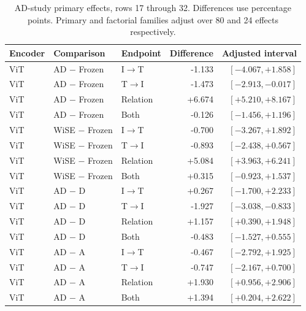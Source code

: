\begin{table}[t]
\centering
\small
\setlength{\tabcolsep}{3pt}
\begin{tabular}{lllrr}
\toprule
Encoder & Comparison & Endpoint & Difference & Adjusted interval\\
\midrule
ViT & AD $-$ Frozen & I$\to$T & -1.133 & $[-4.067,+1.858]$ \\
ViT & AD $-$ Frozen & T$\to$I & -1.473 & $[-2.913,-0.017]$ \\
ViT & AD $-$ Frozen & Relation & +6.674 & $[+5.210,+8.167]$ \\
ViT & AD $-$ Frozen & Both & -0.126 & $[-1.456,+1.196]$ \\
ViT & WiSE $-$ Frozen & I$\to$T & -0.700 & $[-3.267,+1.892]$ \\
ViT & WiSE $-$ Frozen & T$\to$I & -0.893 & $[-2.438,+0.567]$ \\
ViT & WiSE $-$ Frozen & Relation & +5.084 & $[+3.963,+6.241]$ \\
ViT & WiSE $-$ Frozen & Both & +0.315 & $[-0.923,+1.537]$ \\
ViT & AD $-$ D & I$\to$T & +0.267 & $[-1.700,+2.233]$ \\
ViT & AD $-$ D & T$\to$I & -1.927 & $[-3.038,-0.833]$ \\
ViT & AD $-$ D & Relation & +1.157 & $[+0.390,+1.948]$ \\
ViT & AD $-$ D & Both & -0.483 & $[-1.527,+0.555]$ \\
ViT & AD $-$ A & I$\to$T & -0.467 & $[-2.792,+1.925]$ \\
ViT & AD $-$ A & T$\to$I & -0.747 & $[-2.167,+0.700]$ \\
ViT & AD $-$ A & Relation & +1.930 & $[+0.956,+2.906]$ \\
ViT & AD $-$ A & Both & +1.394 & $[+0.204,+2.622]$ \\
\bottomrule
\end{tabular}
\caption{AD-study primary effects, rows 17 through 32. Differences use percentage points. Primary and factorial families adjust over 80 and 24 effects respectively.}\label{tab:adprimary16}
\end{table}


